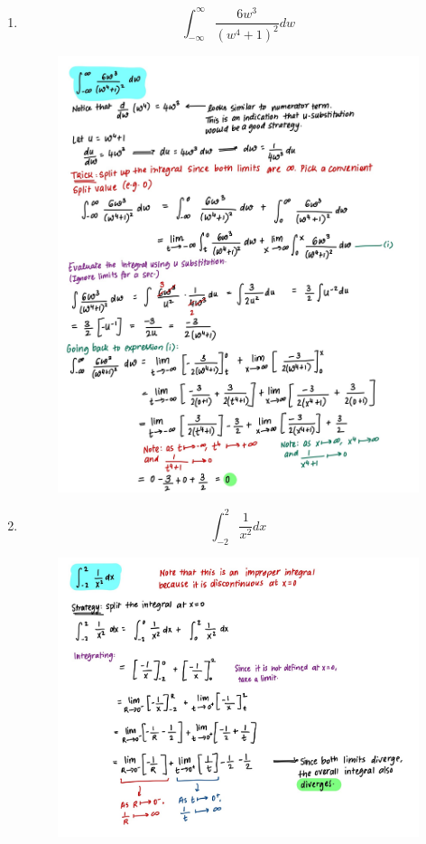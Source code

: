 \documentclass{article}
\begin{document}
\begin{enumerate}
\begin{figure}[H]
        \label{fig:Q2}
    \end{figure}
    \item $$\int_{-\infty}^\infty{\frac{6w^3}{(w^4+1)^2}}dw$$
    \begin{figure}[H]
        \centering
        \includegraphics[width=0.95\linewidth]{Q3.jpg}
        \label{fig:Q3}
    \end{figure}
    \item $$\int_{-2}^2{\frac{1}{x^2}}dx$$
    \begin{figure}[H]
        \centering
        \includegraphics[width=\linewidth]{Q4.jpg}

\end{figure}
\end{enumerate}
\end{document}
